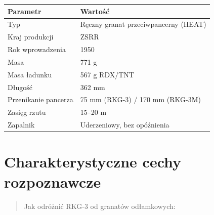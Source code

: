 \documentclass[12pt,openany,oneside]{book}
\begin{document}
\begin{longtable}[]{@{}ll@{}}
\toprule\noalign{}
Parametr & Wartość \\
\midrule\noalign{}
\endhead
\bottomrule\noalign{}
\endlastfoot
Typ & Ręczny granat przeciwpancerny (HEAT) \\
Kraj produkcji & ZSRR \\
Rok wprowadzenia & 1950 \\
Masa & 771 g \\
Masa ładunku & 567 g RDX/TNT \\
Długość & 362 mm \\
Przenikanie pancerza & 75 mm (RKG-3) / 170 mm (RKG-3M) \\
Zasięg rzutu & 15--20 m \\
Zapalnik & Uderzeniowy, bez opóźnienia \\
\end{longtable}

\section{Charakterystyczne cechy
rozpoznawcze}\label{charakterystyczne-cechy-rozpoznawcze-105}

\begin{quote}
Jak odróżnić RKG-3 od granatów odłamkowych:
\end{quote}
\end{document}
